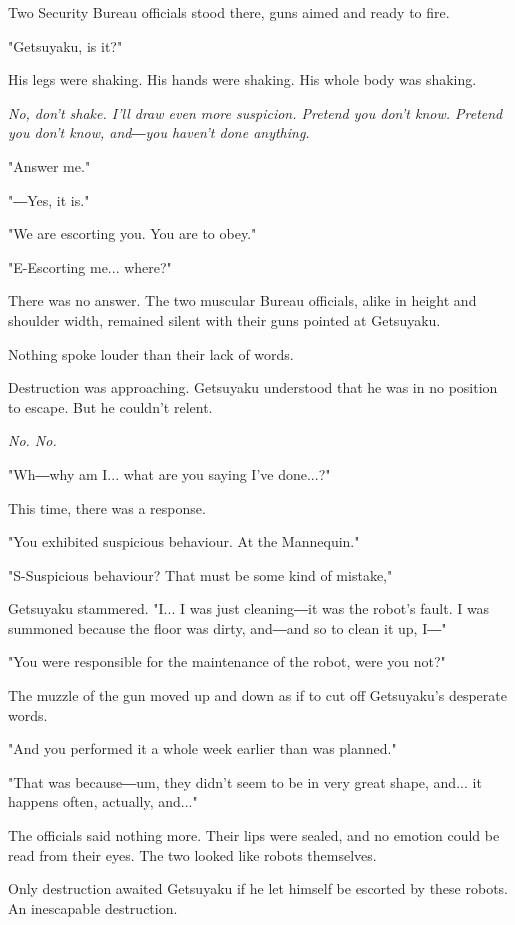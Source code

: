 Two Security Bureau officials stood there, guns aimed and ready to fire.

"Getsuyaku, is it?"

His legs were shaking. His hands were shaking. His whole body was
shaking.

\emph{No, don't shake. I'll draw even more suspicion. Pretend you don't know.
	Pretend you don't know, and―you haven't done anything.}

"Answer me."

"―Yes, it is."

"We are escorting you. You are to obey."

\mybreak

"E-Escorting me... where?"

There was no answer. The two muscular Bureau officials, alike in height
and shoulder width, remained silent with their guns pointed at
Getsuyaku.

Nothing spoke louder than their lack of words.

Destruction was approaching. Getsuyaku understood that he was in no
position to escape. But he couldn't relent.

\emph{No. No.}

"Wh―why am I... what are you saying I've done...?"~

This time, there was a response.

"You exhibited suspicious behaviour. At the Mannequin."

"S-Suspicious behaviour? That must be some kind of mistake,"~

Getsuyaku stammered. "I... I was just cleaning―it was the robot's fault.
I was summoned because the floor was dirty, and―and so to clean it up,
I―"

"You were responsible for the maintenance of the robot, were you not?"

The muzzle of the gun moved up and down as if to cut off Getsuyaku's
desperate words.

"And you performed it a whole week earlier than was planned."

"That was because―um, they didn't seem to be in very great shape, and...
it happens often, actually, and..."

The officials said nothing more. Their lips were sealed, and no emotion
could be read from their eyes. The two looked like robots themselves.

Only destruction awaited Getsuyaku if he let himself be escorted by
these robots. An inescapable destruction.

